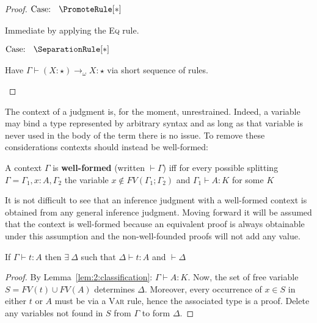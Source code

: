 \begin{proof}
    $\text{Case: }\begin{array}{c} \PromoteRule[*] \end{array}$
    \begin{proofcase}
        Immediate by applying the \textsc{Eq} rule.
    \end{proofcase}

    $\text{Case: }\begin{array}{c} \SeparationRule[*] \end{array}$
    \begin{proofcase}
        Have $\Gamma \vdash (X : \star) \to_\omega X : \star$ via short sequence of rules.
    \end{proofcase}
\end{proof}

The context of a judgment is, for the moment, unrestrained.
Indeed, a variable may bind a type represented by arbitrary syntax and as long as that variable is never used in the body of the term there is no issue.
To remove these considerations contexts should instead be well-formed:
\begin{definition}
    A context $\Gamma$ is \textbf{well-formed} (written $\vdash \Gamma$) iff for every possible splitting $\Gamma = \Gamma_1, x : A, \Gamma_2$ the variable $x \notin FV(\Gamma_1;\Gamma_2)$ and $\Gamma_1 \vdash A : K$ for some $K$
\end{definition}
It is not difficult to see that an inference judgment with a well-formed context is obtained from any general inference judgment.
Moving forward it will be assumed that the context is well-formed because an equivalent proof is always obtainable under this assumption and the non-well-founded proofs will not add any value.
\begin{lemma}
    If $\Gamma \vdash t : A$ then $\exists\ \Delta$ such that $\Delta \vdash t : A$ and $\vdash \Delta$
\end{lemma}
\begin{proof}
    By Lemma~\ref{lem:2:classification}: $\Gamma \vdash A : K$.
    Now, the set of free variable $S = FV(t) \cup FV(A)$ determines $\Delta$.
    Moreover, every occurrence of $x \in S$ in either $t$ or $A$ must be via a \textsc{Var} rule, hence the associated type is a proof.
    Delete any variables not found in $S$ from $\Gamma$ to form $\Delta$.
\end{proof}
